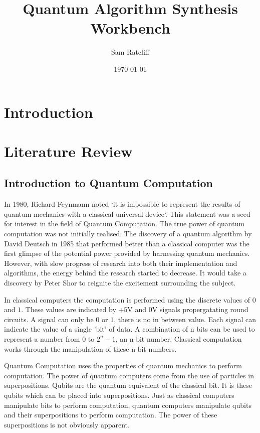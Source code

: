 \documentclass[authoryearcitations]{UoYCSproject}
\author{Sam Ratcliff}
\title{Quantum Algorithm Synthesis Workbench}
\date{\today}
\begin{document}
\maketitle
 
\chapter{Introduction}
\chapter{Literature Review}
\section{Introduction to Quantum Computation}
In 1980, Richard Feynmann noted `it is impossible to represent the results of quantum mechanics with a classical universal device`\cite{Feynman82simulatingphysics}.
This statement was a seed for interest in the field of Quantum Computation.
The true power of quantum computation was not initially realised.
The discovery of a quantum algorithm by David Deutsch\cite{Deutsch1985} in 1985 that performed better than a classical computer was the first glimpse of the potential power provided by harnessing quantum mechanics.
However, with slow progress of research into both their implementation and algorithms, the energy behind the research started to decrease.
It would take a discovery by Peter Shor\cite{Shor:1994jg} to reignite the excitement surrounding the subject.  

In classical computers the computation is performed using the discrete values of $0$ and $1$.
These values are indicated by +$5$V and $0$V signals propergatating round circuits.
A signal can only be $0$ or $1$, there is no in between value.
Each signal can indicate the value of a single 'bit' of data.
A combination of n bits can be used to represent a number from $0$ to $2^n-1$, an n-bit number.
Classical computation works through the manipulation of these n-bit numbers.


Quantum Computation uses the properties of quantum mechanics to perform computation.
The power of quantum computers come from the use of particles in superpositions.
Qubits are the quantum equivalent of the classical bit.
It is these qubits which can be placed into superpositions.
Just as classical computers manipulate bits to perform computation, quantum computers manipulate qubits and their superpositions to perform computation.
The power of these superpositions is not obviously apparent.
\end{document}
